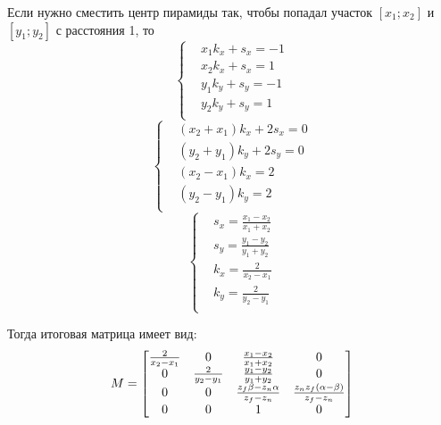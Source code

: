 Если нужно сместить центр пирамиды так,
чтобы попадал участок $[x_1; x_2]$ и $[y_1; y_2]$
с расстояния 1, то
\[
    \left\{
    \begin{aligned}
        & x_1 k_x + s_x = -1 \\
        & x_2 k_x + s_x = 1 \\
        & y_1 k_y + s_y = -1 \\
        & y_2 k_y + s_y = 1 \\
    \end{aligned}
    \right.
\]
\[
    \left\{
    \begin{aligned}
        & (x_2 + x_1) k_x + 2 s_x = 0 \\
        & (y_2 + y_1) k_y + 2 s_y = 0 \\
        & (x_2 - x_1) k_x = 2 \\
        & (y_2 - y_1) k_y = 2 \\
    \end{aligned}
    \right.
\]
\[
    \left\{
    \begin{aligned}
        & s_x = \frac{x_1 - x_2}{x_1 + x_2} \\
        & s_y = \frac{y_1 - y_2}{y_1 + y_2} \\
        & k_x = \frac{2}{x_2 - x_1} \\
        & k_y = \frac{2}{y_2 - y_1} \\
    \end{aligned}
    \right.
\]

Тогда итоговая матрица имеет вид:
\[
    M =
    \begin{bmatrix}
        \frac{2}{x_2 - x_1} & 0 & \frac{x_1 - x_2}{x_1 + x_2} & 0 \\
        0 & \frac{2}{y_2 - y_1} & \frac{y_1 - y_2}{y_1 + y_2} & 0 \\
        0 & 0 & \frac{z_f \beta - z_n \alpha}{z_f - z_n} & \frac{z_n z_f (\alpha - \beta)}{z_f - z_n} \\
        0 & 0 & 1 & 0 \\
    \end{bmatrix}
\]
